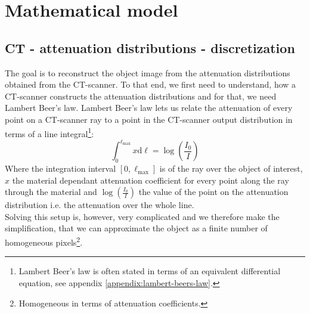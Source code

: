 \documentclass{article}
\begin{document}
\section{Mathematical model}
\vspace*{-0.3\baselineskip}
\subsection{CT - attenuation distributions - discretization}\label{sec:CT-discretization}
The goal is to reconstruct the object image from the attenuation distributions obtained from the CT-scanner. To that end, we first need to understand, how a CT-scanner constructs the attenuation distributions and for that, we need Lambert Beer's law. Lambert Beer's law lets us relate the attenuation of every point on a CT-scanner ray to a point in the CT-scanner output distribution in terms of a line integral\footnote{Lambert Beer's law is often stated in terms of an equivalent differential equation, see appendix \ref{appendix:lambert-beers-law}.}: \\
\begin{equation}
    \int_{0}^{\ell_{\max}}x \text{d} \ell = \log\left(\frac{I_0}{I}\right)
\end{equation}
Where the integration interval $[0, \ell_{\max}]$ is of the ray over the object of interest, $x$ the material dependant attenuation coefficient for every point along the ray through the material and $\log\left(\frac{I_0}{I}\right)$ the value of the point on the attenuation distribution i.e. the attenuation over the whole line. \\
Solving this setup is, however, very complicated and we therefore make the simplification, that we can approximate the object as a finite number of homogeneous pixels\footnote{Homogeneous in terms of attenuation coefficients.}. \\
\vspace*{-0.6\baselineskip}
\end{document}
